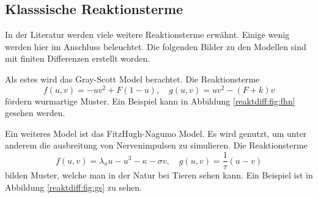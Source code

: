 


\subsection{Klasssische Reaktionsterme}
In der Literatur werden viele weitere Reaktionsterme erwähnt.
Einige wenig werden hier im Anschluss beleuchtet.
Die folgenden Bilder zu den Modellen sind mit finiten Differenzen erstellt worden.

Als estes wird das Gray-Scott Model berachtet.
Die Reaktionsterme
\begin{equation}
     f(u,v) = -uv^2 + F(1 - u), \quad g(u,v) = uv^2 - (F + k)v
     \label{reaktdiff:equ:gs}
\end{equation}
fördern wurmartige Muster.
Ein Beispiel kann in Abbildung \ref{reaktdiff:fig:fhn} gesehen werden.


Ein weiteres Model ist das FitzHugh-Nagumo Model.
Es wird genutzt, um unter anderem die ausbreitung von Nervenimpulsen zu simulieren.
Die Reaktionsterme
\begin{equation}
    f(u,v) = \lambda_u u - u^3 - \kappa - \sigma v, \quad g(u,v) = \frac{1}{\tau}(u - v)
    \label{reaktdiff:equ:fhn}
\end{equation}
bilden Muster, welche man in der Natur bei Tieren sehen kann.
Ein Beispiel ist in Abbildung \ref{reaktdiff:fig:gs} zu sehen.

